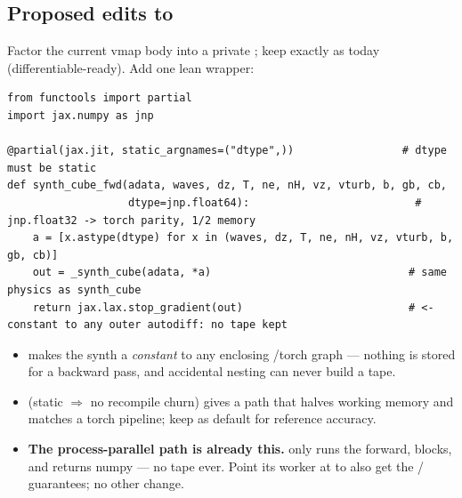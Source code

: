 \subsection*{Proposed edits to }
Factor the current vmap body into a private ; keep  exactly as today
(differentiable-ready). Add one lean wrapper:
\begin{verbatim}
from functools import partial
import jax.numpy as jnp

@partial(jax.jit, static_argnames=("dtype",))                 # dtype must be static
def synth_cube_fwd(adata, waves, dz, T, ne, nH, vz, vturb, b, gb, cb,
                   dtype=jnp.float64):                          # jnp.float32 -> torch parity, 1/2 memory
    a = [x.astype(dtype) for x in (waves, dz, T, ne, nH, vz, vturb, b, gb, cb)]
    out = _synth_cube(adata, *a)                               # same physics as synth_cube
    return jax.lax.stop_gradient(out)                          # <- constant to any outer autodiff: no tape kept
\end{verbatim}
\begin{itemize}
  \item {} makes the synth a \emph{constant} to any enclosing /torch graph ---
        nothing is stored for a backward pass, and accidental nesting can never build a tape.
  \item {} (static $\Rightarrow$ no recompile churn) gives a  path that halves working
        memory and matches a torch pipeline; keep  as default for reference accuracy.
  \item \textbf{The process-parallel path is already this.}  only runs the
        forward, blocks, and returns numpy --- no tape ever. Point its worker at  to also
        get the / guarantees; no other change.
\end{itemize}

